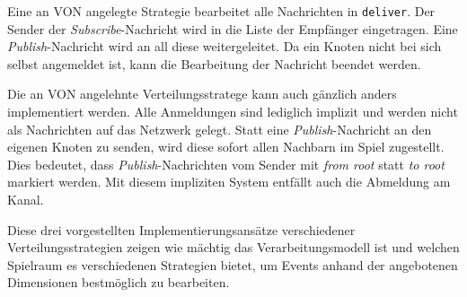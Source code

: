 Eine an VON angelegte Strategie bearbeitet alle Nachrichten in \texttt{deliver}. Der Sender der \emph{Subscribe}-Nachricht wird in die Liste der Empfänger eingetragen. Eine \emph{Publish}-Nachricht wird an all diese weitergeleitet. Da ein Knoten nicht bei sich selbst angemeldet ist, kann die Bearbeitung der Nachricht beendet werden.

Die an VON angelehnte Verteilungsstratege kann auch gänzlich anders implementiert werden. Alle Anmeldungen sind lediglich implizit und werden nicht als Nachrichten auf das Netzwerk gelegt. Statt eine \emph{Publish}-Nachricht an den eigenen Knoten zu senden, wird diese sofort allen Nachbarn im Spiel zugestellt. Dies bedeutet, dass \emph{Publish}-Nachrichten vom Sender mit \emph{from root} statt \emph{to root} markiert werden. Mit diesem impliziten System entfällt auch die Abmeldung am Kanal.

Diese drei vorgestellten Implementierungsansätze verschiedener Verteilungsstrategien zeigen wie mächtig das Verarbeitungsmodell ist und welchen Spielraum es verschiedenen Strategien bietet, um Events anhand der angebotenen Dimensionen bestmöglich zu bearbeiten.
